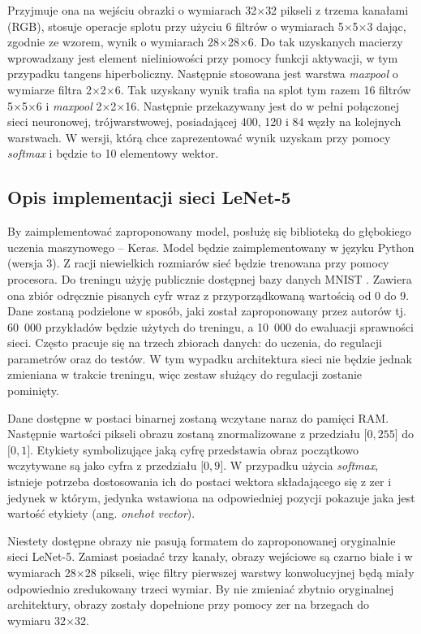 Przyjmuje ona na wejściu obrazki o wymiarach 32\(\times\)32 pikseli z trzema kanałami (RGB), stosuje operacje splotu przy użyciu 6 filtrów o wymiarach 5\(\times\)5\(\times\)3 dając, zgodnie ze wzorem, wynik o wymiarach 28\(\times\)28\(\times\)6.
Do tak uzyskanych macierzy wprowadzany jest element nieliniowości przy pomocy funkcji aktywacji, w tym przypadku tangens hiperboliczny.
Następnie stosowana jest warstwa \textit{maxpool} o wymiarze filtra 2\(\times\)2\(\times\)6. Tak uzyskany wynik trafia na splot
tym razem 16 filtrów 5\(\times\)5\(\times\)6 i \textit{maxpool} 2\(\times\)2\(\times\)16. Następnie przekazywany jest do w pełni połączonej sieci neuronowej, trójwarstwowej, posiadającej 400, 120 i 84 węzły na kolejnych warstwach. W wersji, którą chce zaprezentować wynik uzyskam przy pomocy \textit{softmax} i będzie to 10 elementowy wektor.

\subsection{Opis implementacji sieci LeNet-5}

By zaimplementować zaproponowany model, posłużę się biblioteką do
głębokiego uczenia maszynowego -- Keras. Model będzie zaimplementowany w
języku Python (wersja 3). Z racji niewielkich rozmiarów sieć będzie trenowana przy pomocy procesora. Do
treningu użyję publicznie dostępnej bazy danych MNIST \cite{mnist}. Zawiera ona zbiór odręcznie pisanych cyfr wraz z przyporządkowaną wartością od 0 do 9.
Dane zostaną podzielone w
sposób, jaki został zaproponowany przez autorów tj. 60~000 przykładów
będzie użytych do treningu, a 10~000 do ewaluacji sprawności sieci.
Często pracuje się na trzech zbiorach danych: do uczenia, do regulacji
parametrów oraz do testów. W tym wypadku architektura sieci nie będzie
jednak zmieniana w trakcie treningu, więc zestaw służący do regulacji
zostanie pominięty.

Dane dostępne w postaci binarnej zostaną wczytane naraz do pamięci RAM.
Następnie wartości pikseli obrazu zostaną znormalizowane z przedziału
\({[}0, 255{]}\) do \({[}0, 1{]}\). Etykiety symbolizujące jaką cyfrę przedstawia obraz początkowo wczytywane są jako cyfra
z przedziału \({[}0, 9{]}\). W przypadku użycia \textit{softmax}, istnieje potrzeba
dostosowania ich do postaci wektora składającego się z zer i jedynek w
którym, jedynka wstawiona na odpowiedniej pozycji pokazuje jaka jest
wartość etykiety (ang. \textit{onehot vector}).

Niestety dostępne obrazy nie pasują formatem do zaproponowanej
oryginalnie sieci LeNet-5. Zamiast posiadać trzy kanały, obrazy
wejściowe są czarno białe i w wymiarach 28\(\times\)28 pikseli, więc
filtry pierwszej warstwy konwolucyjnej będą miały odpowiednio
zredukowany trzeci wymiar. By nie zmieniać zbytnio oryginalnej
architektury, obrazy zostały dopełnione przy pomocy zer na brzegach do
wymiaru 32\(\times\)32.

